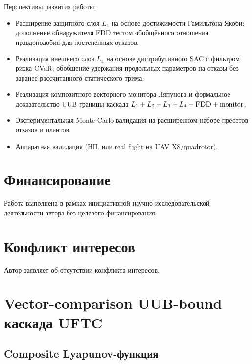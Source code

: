 \documentclass[a4paper,14pt]{extarticle}
\newcommand{\FDD}{\textsc{FDD}}
\begin{document}
Перспективы развития работы:
\begin{itemize}
\item Расширение защитного слоя $L_1$ на основе достижимости Гамильтона-Якоби; дополнение обнаружителя \FDD{} тестом обобщённого отношения правдоподобия для постепенных отказов.
\item Реализация внешнего слоя $L_4$ на основе дистрибутивного SAC с фильтром риска CVaR; обобщение удержания продольных параметров на отказы без заранее рассчитанного статического трима.
\item Реализация композитного векторного монитора Ляпунова и формальное доказательство UUB-границы каскада $L_1+L_2+L_3+L_4+\FDD{}+\text{monitor}$.
\item Экспериментальная Monte-Carlo валидация на расширенном наборе пресетов отказов и плантов.
\item Аппаратная валидация (HIL или real flight на UAV X8/quadrotor).
\end{itemize}

\section*{Финансирование}

Работа выполнена в рамках инициативной научно-исследовательской деятельности автора без целевого финансирования.

\section*{Конфликт интересов}

Автор заявляет об отсутствии конфликта интересов.

\section{Vector-comparison UUB-bound каскада UFTC}
\label{sec:uub-lemma}

\subsection{Composite Lyapunov-функция}
\end{document}
